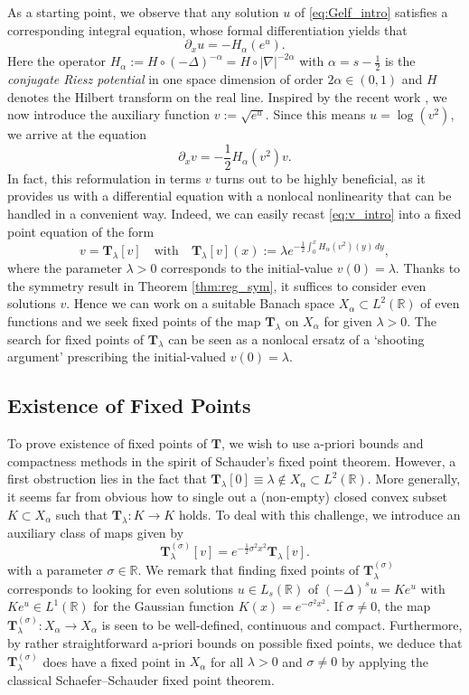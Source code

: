\documentclass[reqno,10pt,a4paper]{amsart}
\theoremstyle{definition}
\theoremstyle{definition}
\theoremstyle{remark}
\theoremstyle{remark}
\numberwithin{equation}{section}
\newcommand{\R}{\mathbb{R}}
\newcommand{\pt}{\partial}
\newcommand{\be}{\begin{equation}}
\newcommand{\ee}{\end{equation}}
\newcommand{\Ds}{(-\Delta)^{s}}
\newcommand{\Ts}{\mathbf{T}}
\newcommand{\Tss}{\mathbf{T}^{(\sigma)}_\lambda}
\begin{document}
As a starting point, we observe that any solution $u$ of \eqref{eq:Gelf_intro} satisfies a corresponding integral equation, whose formal differentiation yields that
\be
\pt_x u = -H_\alpha(e^u).
\ee 
Here the operator $H_\alpha := H \circ (-\Delta)^{-\alpha} = H \circ |\nabla|^{-2 \alpha}$ with $\alpha = s- \frac{1}{2}$ is the {\em conjugate Riesz potential} in one space dimension of order $2\alpha \in (0,1)$ and $H$ denotes the Hilbert transform on the real line. Inspired by the recent work \cite{AhLe-22}, we now introduce the auxiliary function $v := \sqrt{e^u}$. Since this means $u = \log(v^2)$, we arrive at the equation
\be \label{eq:v_intro}
\pt_x v = -\frac{1}{2} H_\alpha(v^2) v .
\ee
In fact, this reformulation in terms $v$ turns out to be highly beneficial, as it provides us with a differential equation with a nonlocal nonlinearity that can be handled in a convenient way. Indeed, we can easily recast  \eqref{eq:v_intro} into a fixed point equation of the form
\be
v = \Ts_\lambda[v] \quad \mbox{with} \quad \Ts_\lambda[v](x) := \lambda e^{-\frac 1 2 \int_0^x H_\alpha(v^2)(y) \, dy},
\ee   
where the parameter $\lambda > 0$ corresponds to the initial-value $v(0)= \lambda$. Thanks to the symmetry result in Theorem \ref{thm:reg_sym}, it suffices to consider even solutions $v$. Hence we can work on a suitable Banach space $X_\alpha \subset L^2(\R)$ of even functions and we seek fixed points of the map $\Ts_\lambda$ on $X_\alpha$ for given $\lambda >0$. The search for fixed points of $\Ts_\lambda$ can be seen as a nonlocal ersatz of a `shooting argument' prescribing the initial-valued $v(0)=\lambda$.
 
\subsection{Existence of Fixed Points}
To prove existence of fixed points of $\Ts$, we wish to use a-priori bounds and compactness methods in the spirit of Schauder's fixed point theorem. However, a first obstruction lies in the fact that $\mathbf{T}_\lambda[0] \equiv \lambda \not \in X_\alpha \subset L^2(\R)$. More generally, it seems far from obvious how to single out a (non-empty) closed convex subset $K \subset X_\alpha$ such that $\mathbf{T}_{\lambda} : K \to K$ holds. To deal with this challenge, we introduce an auxiliary class of maps given by
\be
\Tss[v] = e^{-\frac{1}{2} \sigma^2 x^2} \Ts_\lambda[v] .
\ee
with a parameter $\sigma \in \R$. We remark that finding fixed points of $\Tss$ corresponds to looking for even solutions $u \in L_s(\R)$ of $\Ds u = K e^u$ with $K e^u \in L^1(\R)$ for the Gaussian function $K(x) = e^{-\sigma^2 x ^2}$. If $\sigma \neq 0$, the map $\Tss : X_\alpha \to X_\alpha$ is seen to be well-defined, continuous and compact. Furthermore, by rather straightforward a-priori bounds on possible fixed points, we deduce that $\Tss$ does have a fixed point in $X_\alpha$ for all $\lambda >0$ and $\sigma \neq 0$ by applying the classical Schaefer--Schauder fixed point theorem.
\end{document}
